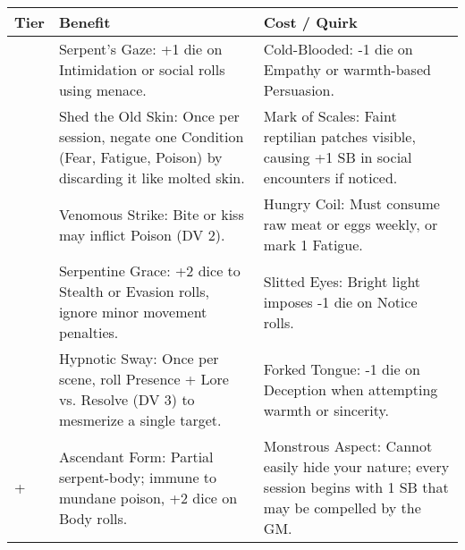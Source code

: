 \begin{longtable}{>{\raggedright\arraybackslash}p{1cm} p{5cm} p{5cm}}
\toprule
\textbf{Tier} & \textbf{Benefit} & \textbf{Cost / Quirk} \\
\midrule
1 & Serpent's Gaze: +1 die on Intimidation or social rolls using menace. & Cold-Blooded: -1 die on Empathy or warmth-based Persuasion. \\
\midrule
2 & Shed the Old Skin: Once per session, negate one Condition (Fear, Fatigue, Poison) by discarding it like molted skin. & Mark of Scales: Faint reptilian patches visible, causing +1 SB in social encounters if noticed. \\
\midrule
3 & Venomous Strike: Bite or kiss may inflict Poison (DV 2). & Hungry Coil: Must consume raw meat or eggs weekly, or mark 1 Fatigue. \\
\midrule
4 & Serpentine Grace: +2 dice to Stealth or Evasion rolls, ignore minor movement penalties. & Slitted Eyes: Bright light imposes -1 die on Notice rolls. \\
\midrule
5 & Hypnotic Sway: Once per scene, roll Presence + Lore vs. Resolve (DV 3) to mesmerize a single target. & Forked Tongue: -1 die on Deception when attempting warmth or sincerity. \\
\midrule
6+ & Ascendant Form: Partial serpent-body; immune to mundane poison, +2 dice on Body rolls. & Monstrous Aspect: Cannot easily hide your nature; every session begins with 1 SB that may be compelled by the GM. \\
\bottomrule
\end{longtable}